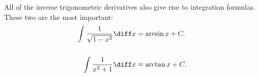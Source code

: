 \begin{frame}
All of the inverse trigonometric derivatives also give rise to integration formulas.  These two are the most important:
\begin{align*}
\int \frac{1}{\sqrt{1-x^2}}\diff x & = \arcsin x + C.\\
& \\
\int \frac{1}{x^2 + 1}\diff x & = \arctan x + C.
\end{align*}
\end{frame}
